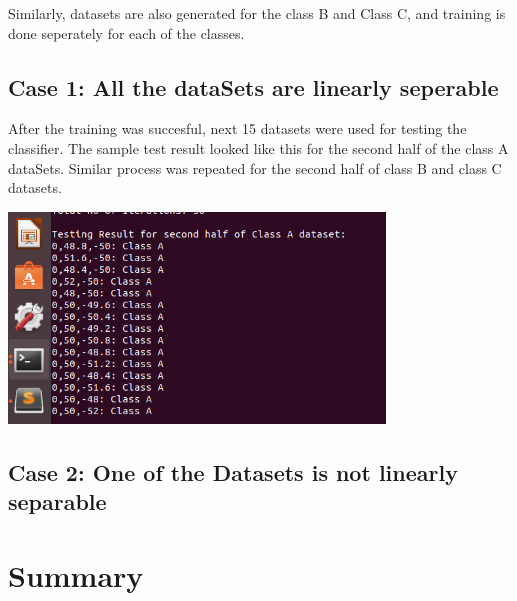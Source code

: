 \documentclass[letterpaper]{article}
\begin{document}
  Similarly, datasets are also generated for the class B and Class C, and training is done seperately for each of the classes. 

  \subsection {Case 1: All the dataSets are linearly seperable}
  After the training was succesful, next 15 datasets were used for testing the classifier. The sample test result looked like this for the second half of the class A dataSets. Similar process was repeated for the second half of class B and class C datasets. 

  

  \includegraphics[width=10cm]{test_result}

  \subsection {Case 2: One of the Datasets is not linearly separable}

  \section {Summary}
  
\end{document}
